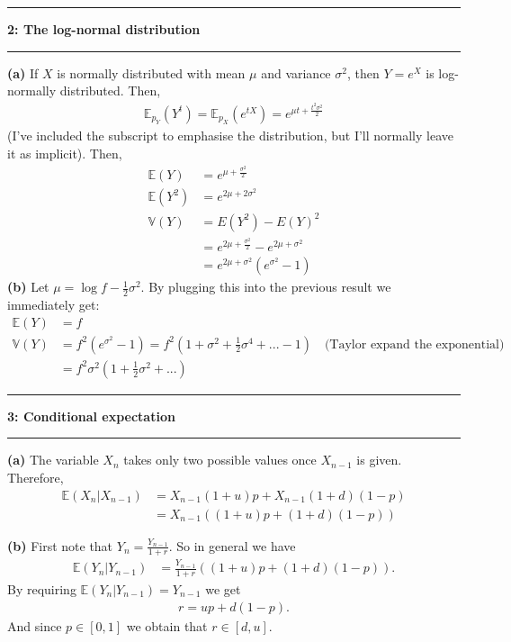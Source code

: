 \documentclass[11pt]{article}
\newcommand\question[2]{\vspace{.25in}\hrule\textbf{#1: #2}\vspace{.5em}\hrule\vspace{.10in}}
\renewcommand\part[1]{\vspace{.10in}\textbf{(#1)}}
\newcommand{\E}{\mathbb{E}}
\newcommand{\V}{\mathbb{V}}
\begin{document}
\question{2}{The log-normal distribution}
\part{a} If $X$ is normally distributed with mean $\mu$ and variance $\sigma^2$, then $Y = e^{X}$ is log-normally distributed. Then,
\begin{align}
    \E_{p_Y}(Y^t) = \E_{p_X}(e^{t X}) = e^{\mu t + \frac{t^2 \sigma^2}{2}}
\end{align}
(I've included the subscript to emphasise the distribution, but I'll normally leave it as implicit). Then,
\begin{align}
    \E(Y)   &= e^{\mu + \frac{\sigma^2}{2}} \\
    \E(Y^2) &= e^{2\mu + 2\sigma^2} \\
    \V(Y)   &= E(Y^2) - E(Y)^2 \nonumber \\
            &= e^{2\mu + \frac{\sigma^2}{2}} - e^{2\mu + \sigma^2} \nonumber\\
            &= e^{2\mu + \sigma^2}(e^{\sigma^2} - 1)
\end{align}
\part{b} Let $\mu = \log f - \frac12 \sigma^2$. By plugging this into the previous result we immediately get:
\begin{align}
    \E(Y) &= f \\
    \V(Y) &= f^2 (e^{\sigma^2} - 1) = f^2 (1 + \sigma^2 + \frac12\sigma^4 + ... - 1)\quad\text{(Taylor expand the exponential)}\nonumber\\
          &= f^2 \sigma^2(1 + \frac12\sigma^2 + ...)
\end{align}

\question{3}{Conditional expectation}

\part{a} The variable $X_n$ takes only two possible values once $X_{n-1}$ is given. Therefore,
\begin{align}
    \E(X_n\vert X_{n-1}) &= X_{n-1}(1 + u) p + X_{n-1}(1 + d)(1 - p) \nonumber\\
                         &= X_{n-1}((1 + u)p + (1 + d)(1 - p))
\end{align}

\part{b} First note that $Y_n = \frac{Y_{n-1}}{1 + r}$. So in general we have
\begin{align}
    \E(Y_n\vert Y_{n-1}) &= \frac{Y_{n-1}}{1 + r}\left((1 + u)p + (1 + d)(1 - p)\right).
\end{align}
By requiring $\E(Y_n\vert Y_{n-1}) = Y_{n-1}$ we get
\begin{align}
    r = up + d(1 - p).
\end{align}
And since $p\in\left[0, 1\right]$ we obtain that $r\in\left[d, u\right]$.
\end{document}
